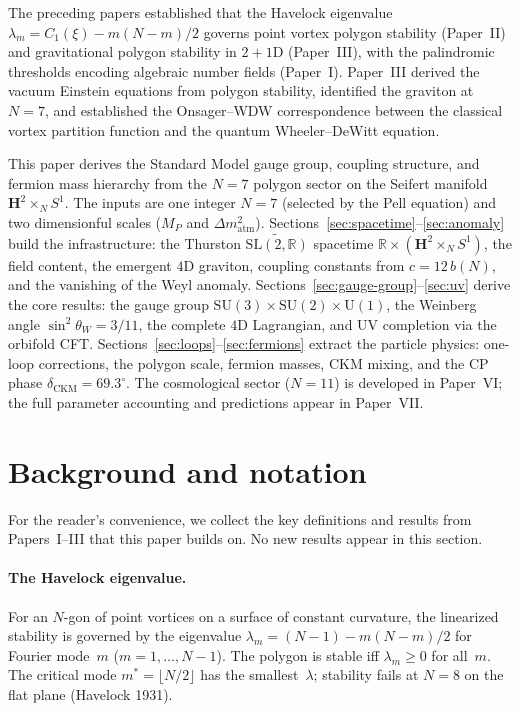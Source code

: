 The preceding papers established that the Havelock eigenvalue
$\lambda_m = C_1(\xi) - m(N{-}m)/2$ governs point vortex
polygon stability (Paper~II) and gravitational polygon stability
in $2{+}1$D (Paper~III), with the palindromic thresholds
encoding algebraic number fields (Paper~I).
Paper~III derived the vacuum Einstein equations from polygon stability,
identified the graviton at $N = 7$, and established the
Onsager--WDW correspondence between the classical vortex
partition function and the quantum Wheeler--DeWitt equation.

This paper derives the Standard Model gauge group, coupling
structure, and fermion mass hierarchy from the $N = 7$
polygon sector on the Seifert manifold
$\mathbf{H}^2 \times_N S^1$.
The inputs are one integer $N = 7$ (selected by the Pell
equation) and two dimensionful scales ($M_P$ and $\Delta m^2_{\mathrm{atm}}$).
Sections~\ref{sec:spacetime}--\ref{sec:anomaly} build the
infrastructure: the Thurston
$\widetilde{\mathrm{SL}(2,\mathbb{R})}$ spacetime
$\mathbb{R} \times (\mathbf{H}^2 \times_N S^1)$,
the field content, the emergent $4$D graviton,
coupling constants from $c = 12\,b(N)$, and the
vanishing of the Weyl anomaly.
Sections~\ref{sec:gauge-group}--\ref{sec:uv} derive the core
results: the gauge group
$\mathrm{SU}(3) \times \mathrm{SU}(2) \times \mathrm{U}(1)$,
the Weinberg angle $\sin^2\theta_W = 3/11$,
the complete $4$D Lagrangian, and UV completion via the
orbifold CFT.
Sections~\ref{sec:loops}--\ref{sec:fermions} extract the
particle physics: one-loop corrections, the polygon scale,
fermion masses, CKM mixing, and the CP phase
$\delta_{\mathrm{CKM}} = 69.3^\circ$.
The cosmological sector ($N = 11$) is developed in Paper~VI;
the full parameter accounting and predictions appear in Paper~VII.

\section{Background and notation}
\label{sec:background}

For the reader's convenience, we collect the key definitions
and results from Papers~I--III that this paper builds on.
No new results appear in this section.

\paragraph{The Havelock eigenvalue.}
For an $N$-gon of point vortices on a surface of constant curvature,
the linearized stability is governed by the eigenvalue
$\lambda_m = (N{-}1) - m(N{-}m)/2$ for Fourier mode~$m$
($m = 1, \ldots, N{-}1$).
The polygon is stable iff $\lambda_m \ge 0$ for all~$m$.
The critical mode $m^* = \lfloor N/2 \rfloor$ has the smallest~$\lambda$;
stability fails at $N = 8$ on the flat plane (Havelock 1931).

